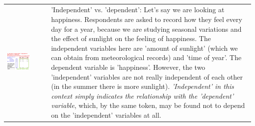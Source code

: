  \\
\begin{tabular}{p{}|p{}|}
\cline{2-2}
\includegraphics[width=0.6\textwidth]{table_general_terms.png}&\parbox[b][0.5\textwidth][t]{0.35\textwidth}{\vspace{-0.7ex} \footnotesize{'Independent' vs. 'dependent': Let's say we are looking at happiness. Respondents are asked to record how they feel every day for a year, because we are studying seasonal variations and the effect of sunlight on the feeling of happiness. The independent variables here are 'amount of sunlight' (which we can obtain from meteorological records) and 'time of year'. The dependent variable is 'happiness'. However, the two 'independent' variables are not really independent of each other (in the summer there is more sunlight). \emph{'Independent' in this context simply indicates the relationship with the 'dependent' variable}, which, by the same token, may be found not to depend on the 'independent' variables at all.}} \\
\end{tabular}
\newpage

